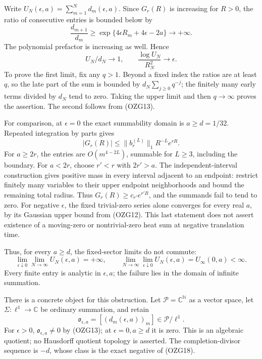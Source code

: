 \documentclass[
  10pt,
  a4paper,
]{article}
\begin{document}
Write \(U_N(\epsilon,a)=\sum_{m=1}^Nd_m(\epsilon,a)\). Since \(G_r(R)\)
is increasing for \(R>0\), the ratio of consecutive entries is bounded
below by \[
\frac{d_{m+1}}{d_m}\ge
\exp\{4\epsilon R_m+4\epsilon-2a\}\longrightarrow+\infty.
\tag{OZG14}
\] The polynomial prefactor is increasing as well. Hence \[
U_N/d_N\longrightarrow1,\qquad
\frac{\log U_N}{R_N^2}\longrightarrow\epsilon.
\tag{OZG15}
\] To prove the first limit, fix any \(q>1\). Beyond a fixed index the
ratios are at least \(q\), so the late part of the sum is bounded by
\(d_N\sum_{j\ge0}q^{-j}\); the finitely many early terms divided by
\(d_N\) tend to zero. Taking the upper limit and then \(q\to\infty\)
proves the assertion. The second follows from (OZG13).

For comparison, at \(\epsilon=0\) the exact summability domain is
\(a\ge d=1/32\). Repeated integration by parts gives \[
|G_r(R)|\le \|b_r^{(L)}\|_1 R^{-L}e^{rR}.
\tag{OZG16}
\] For \(a\ge2r\), the entries are \(O(m^{4-2L})\), summable for
\(L\ge3\), including the boundary. For \(a<2r\), choose \(r'<r\) with
\(2r'>a\). The independent-interval construction gives positive mass in
every interval adjacent to an endpoint: restrict finitely many variables
to their upper endpoint neighborhoods and bound the remaining total
radius. Thus \(G_r(R)\ge c_{r'}e^{r'R}\), and the summands fail to tend
to zero. For negative \(\epsilon\), the fixed trivial-zero series alone
converges for every real \(a\), by its Gaussian upper bound from
(OZG12). This last statement does not assert existence of a moving-zero
or nontrivial-zero heat sum at negative translation time.

Thus, for every \(a\ge d\), the fixed-sector limits do not commute: \[
\lim_{\epsilon\downarrow0}\lim_{N\to\infty}U_N(\epsilon,a)=+\infty,
\qquad
\lim_{N\to\infty}\lim_{\epsilon\downarrow0}U_N(\epsilon,a)
=U_\infty(0,a)<\infty.
\tag{OZG17}
\] Every finite entry is analytic in \(\epsilon,a\); the failure lies in
the domain of infinite summation.

There is a concrete object for this obstruction. Let
\(\mathcal P=\mathbb C^{\mathbb N}\) as a vector space, let
\(\Sigma:\ell^1\to\mathbb C\) be ordinary summation, and retain \[
\mathfrak o_{\epsilon,a}=[(d_m(\epsilon,a))_m]\in\mathcal P/\ell^1 .
\tag{OZG18}
\] For \(\epsilon>0\), \(\mathfrak o_{\epsilon,a}\ne0\) by (OZG13); at
\(\epsilon=0,a\ge d\) it is zero. This is an algebraic quotient; no
Hausdorff quotient topology is asserted. The completion-divisor sequence
is \(-d\), whose class is the exact negative of (OZG18).
\end{document}
